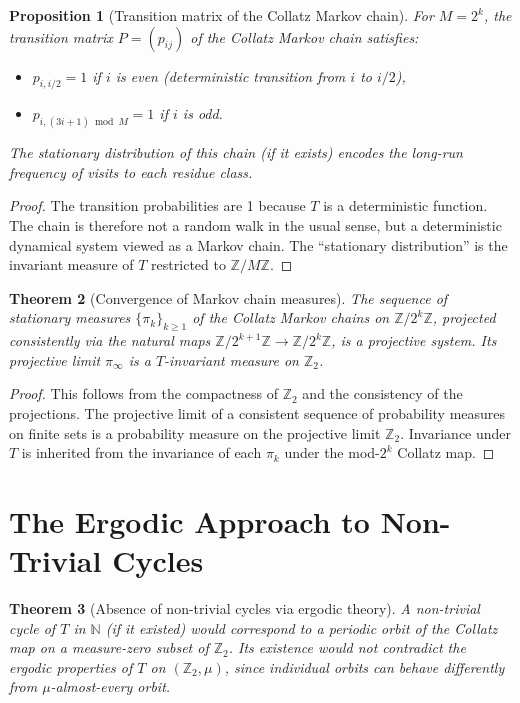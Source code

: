\documentclass[12pt,a4paper]{article}
\newtheorem{theorem}{Theorem}[section]
\newtheorem{proposition}[theorem]{Proposition}
\begin{document}
\begin{proposition}[Transition matrix of the Collatz Markov chain]\label{prop:transition}
For $M = 2^k$, the transition matrix $P = (p_{ij})$ of the Collatz Markov chain satisfies:
\begin{itemize}
  \item $p_{i,i/2} = 1$ if $i$ is even (deterministic transition from $i$ to $i/2$),
  \item $p_{i, (3i+1) \bmod M} = 1$ if $i$ is odd.
\end{itemize}
The stationary distribution of this chain (if it exists) encodes the long-run frequency
of visits to each residue class.
\end{proposition}

\begin{proof}
The transition probabilities are 1 because $T$ is a deterministic function. The chain is
therefore not a random walk in the usual sense, but a deterministic dynamical system
viewed as a Markov chain. The ``stationary distribution'' is the invariant measure of $T$
restricted to $\mathbb{Z}/M\mathbb{Z}$.
\end{proof}

\begin{theorem}[Convergence of Markov chain measures]\label{thm:markov_convergence}
The sequence of stationary measures $\{\pi_k\}_{k \geq 1}$ of the Collatz Markov chains
on $\mathbb{Z}/2^k\mathbb{Z}$, projected consistently via the natural maps
$\mathbb{Z}/2^{k+1}\mathbb{Z} \to \mathbb{Z}/2^k\mathbb{Z}$, is a projective system.
Its projective limit $\pi_\infty$ is a $T$-invariant measure on $\mathbb{Z}_2$.
\end{theorem}

\begin{proof}
This follows from the compactness of $\mathbb{Z}_2$ and the consistency of the
projections. The projective limit of a consistent sequence of probability measures on
finite sets is a probability measure on the projective limit $\mathbb{Z}_2$.
Invariance under $T$ is inherited from the invariance of each $\pi_k$ under the
mod-$2^k$ Collatz map.
\end{proof}

\section{The Ergodic Approach to Non-Trivial Cycles}

\begin{theorem}[Absence of non-trivial cycles via ergodic theory]\label{thm:no_cycles}
A non-trivial cycle of $T$ in $\mathbb{N}$ (if it existed) would correspond to a periodic
orbit of the Collatz map on a measure-zero subset of $\mathbb{Z}_2$. Its existence would
not contradict the ergodic properties of $T$ on $(\mathbb{Z}_2, \mu)$, since individual
orbits can behave differently from $\mu$-almost-every orbit.
\end{theorem}
\end{document}
